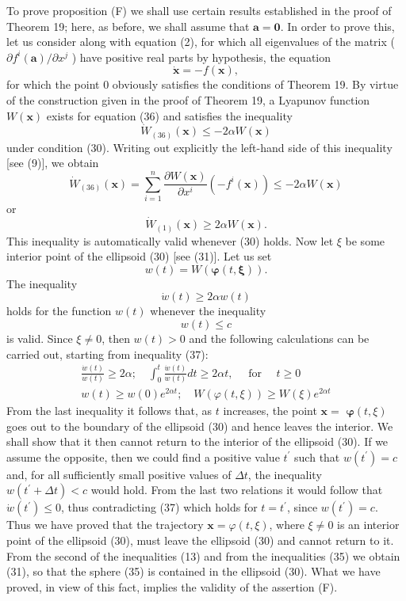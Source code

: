 \documentclass[10pt,a5paper]{book}
\theoremstyle{plain}
\theoremstyle{definition}
\theoremstyle{remark}
\begin{document}
To prove proposition (F) we shall use certain results established in the proof of Theorem 19; here, as before, we shall assume that $\mathbf{a}=\mathbf{0}$. In order to prove this, let us consider along with equation (2), for which all eigenvalues of the matrix ( $\partial f^{i}(\mathbf{a}) / \partial x^{j}$ ) have positive real parts by hypothesis, the equation
\begin{equation*}
\dot{\mathbf{x}}=-f(\mathbf{x}), \tag{36}
\end{equation*}
for which the point 0 obviously satisfies the conditions of Theorem 19. By virtue of the construction given in the proof of Theorem 19, a Lyapunov function $W(\mathbf{x})$ exists for equation (36) and satisfies the inequality
\[
\dot{W}_{(36)}(\mathbf{x}) \leq-2 \alpha W(\mathbf{x})
\]
under condition (30). Writing out explicitly the left-hand side of this inequality [see (9)], we obtain
\[
\dot{W}_{(36)}(\mathbf{x})=\sum_{i=1}^{n} \frac{\partial W(\mathbf{x})}{\partial x^{i}}\left(-f^{i}(\mathbf{x})\right) \leq-2 \alpha W(\mathbf{x})
\]
or
\[
\dot{W}_{(1)}(\mathbf{x}) \geq 2 \alpha W(\mathbf{x}) .
\]
This inequality is automatically valid whenever (30) holds. Now let $\xi$ be some interior point of the ellipsoid (30) [see (31)]. Let us set
\[
w(t)=W(\boldsymbol{\varphi}(t, \boldsymbol{\xi})) .
\]
The inequality
\begin{equation*}
\dot{w}(t) \geq 2 \alpha w(t) \tag{37}
\end{equation*}
holds for the function $w(t)$ whenever the inequality
\[
w(t) \leq c
\]
is valid. Since $\xi \neq 0$, then $w(t)>0$ and the following calculations can be carried out, starting from inequality (37):
\[
\begin{gathered}
\frac{\dot{w}(t)}{w(t)} \geq 2 \alpha ; \quad \int_{0}^{t} \frac{\dot{w}(t)}{w(t)} d t \geq 2 \alpha t, \quad \text { for } \quad t \geq 0 \\
w(t) \geq w(0) e^{2 \alpha t} ; \quad W(\varphi(t, \xi)) \geq W(\xi) e^{2 \alpha t}
\end{gathered}
\]
From the last inequality it follows that, as $t$ increases, the point $\mathbf{x}=$
$\boldsymbol{\varphi}(t, \xi)$ goes out to the boundary of the ellipsoid (30) and hence leaves the interior. We shall show that it then cannot return to the interior of the ellipsoid (30). If we assume the opposite, then we could find a positive value $t^{\prime}$ such that $w\left(t^{\prime}\right)=c$ and, for all sufficiently small positive values of $\Delta t$, the inequality $w\left(t^{\prime}+\Delta t\right)<c$ would hold. From the last two relations it would follow that $\dot{w}\left(t^{\prime}\right) \leq 0$, thus contradicting (37) which holds for $t=t^{\prime}$, since $w\left(t^{\prime}\right)=c$. Thus we have proved that the trajectory $\mathbf{x}=\varphi(t, \xi)$, where $\xi \neq 0$ is an interior point of the ellipsoid (30), must leave the ellipsoid (30) and cannot return to it. From the second of the inequalities (13) and from the inequalities (35) we obtain (31), so that the sphere (35) is contained in the ellipsoid (30). What we have proved, in view of this fact, implies the validity of the assertion (F).
\end{document}
